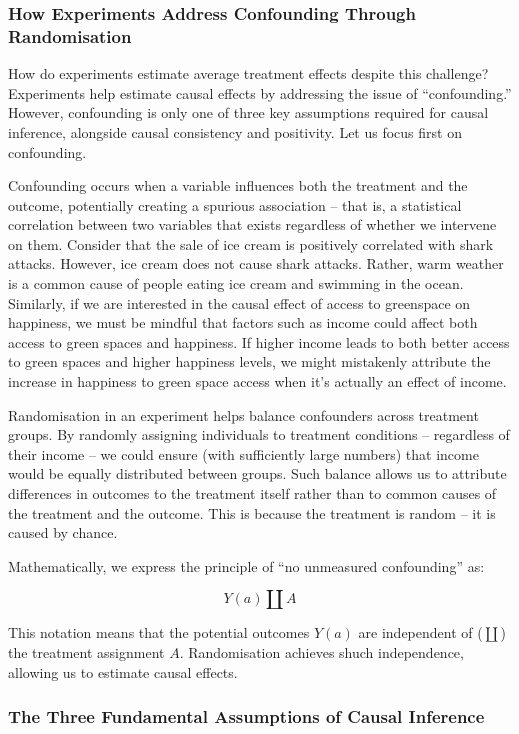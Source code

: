 \documentclass[
  singlecolumn]{article}
\begin{document}
\subsubsection{How Experiments Address Confounding Through
Randomisation}\label{how-experiments-address-confounding-through-randomisation}

How do experiments estimate average treatment effects despite this
challenge? Experiments help estimate causal effects by addressing the
issue of ``confounding.'' However, confounding is only one of three key
assumptions required for causal inference, alongside causal consistency
and positivity. Let us focus first on confounding.

Confounding occurs when a variable influences both the treatment and the
outcome, potentially creating a spurious association -- that is, a
statistical correlation between two variables that exists regardless of
whether we intervene on them. Consider that the sale of ice cream is
positively correlated with shark attacks. However, ice cream does not
cause shark attacks. Rather, warm weather is a common cause of people
eating ice cream and swimming in the ocean. Similarly, if we are
interested in the causal effect of access to greenspace on happiness, we
must be mindful that factors such as income could affect both access to
green spaces and happiness. If higher income leads to both better access
to green spaces and higher happiness levels, we might mistakenly
attribute the increase in happiness to green space access when it's
actually an effect of income.

Randomisation in an experiment helps balance confounders across
treatment groups. By randomly assigning individuals to treatment
conditions -- regardless of their income -- we could ensure (with
sufficiently large numbers) that income would be equally distributed
between groups. Such balance allows us to attribute differences in
outcomes to the treatment itself rather than to common causes of the
treatment and the outcome. This is because the treatment is random -- it
is caused by chance.

Mathematically, we express the principle of ``no unmeasured
confounding'' as:

\[
Y(a) \coprod A
\]

This notation means that the potential outcomes \(Y(a)\) are independent
of (\(\coprod\)) the treatment assignment \(A\). Randomisation achieves
shuch independence, allowing us to estimate causal effects.

\subsubsection{The Three Fundamental Assumptions of Causal
Inference}\label{the-three-fundamental-assumptions-of-causal-inference}
\end{document}
